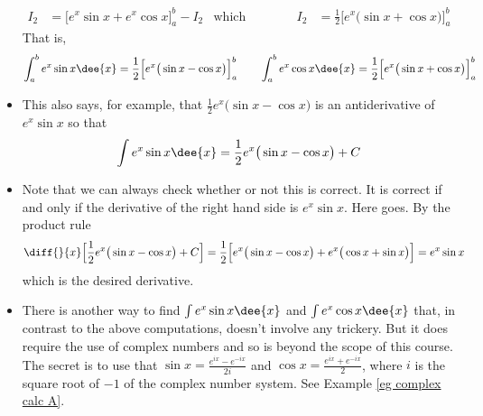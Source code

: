 \begin{eg}
\begin{itemize}
\begin{align*}
I_2 &=\Big[e^x\sin x +e^x\cos x\Big]_a^b -I_2
& \text{which implies}&&
I_2&=\frac{1}{2}\Big[e^x\big(\sin x+\cos x\big)\Big]_a^b
\end{align*}
That is,
\begin{align*}
\int_a^b e^x\sin x\dee{x}=
\frac{1}{2}\Big[e^x\big(\sin x-\cos x\big)\Big]_a^b
\qquad
\int_a^b e^x\cos x\dee{x}=
\frac{1}{2}\Big[e^x\big(\sin x+\cos x\big)\Big]_a^b
\end{align*}
\item This also says, for example,
that $\frac{1}{2}e^x\big(\sin x-\cos x\big)$ is an antiderivative
of $e^x\sin x$ so that
\begin{align*}
\int e^x\sin x\dee{x}=\frac{1}{2}e^x\big(\sin x-\cos x\big)+C
\end{align*}
\item Note that we can always check whether or not this is correct. It is
correct if and only if the derivative of the right hand side is $e^x\sin x$.
Here goes. By the product rule
\begin{align*}
\diff{}{x}\Big[\frac{1}{2}e^x\big(\sin x-\cos x\big)+C\Big]
&=\frac{1}{2}\Big[e^x\big(\sin x-\cos x\big)+e^x\big(\cos x+\sin x\big)\Big]
=e^x\sin x
\end{align*}
which is the desired derivative.

\item There is another way to find $\int e^x\sin x\dee{x}$ and
$\int e^x\cos x\dee{x}$ that, in contrast to the above computations,
doesn't involve any trickery. But it does require the use of complex
numbers and so is beyond the scope of this course.
The secret is to use that $\sin x =\frac{e^{ix}-e^{-ix}}{2i}$
and $\cos x =\frac{e^{ix}+e^{-ix}}{2}$, where $i$ is the square root of
$-1$ of the complex number system. See Example \ref{eg complex calc A}.

\end{itemize}

\end{eg}


